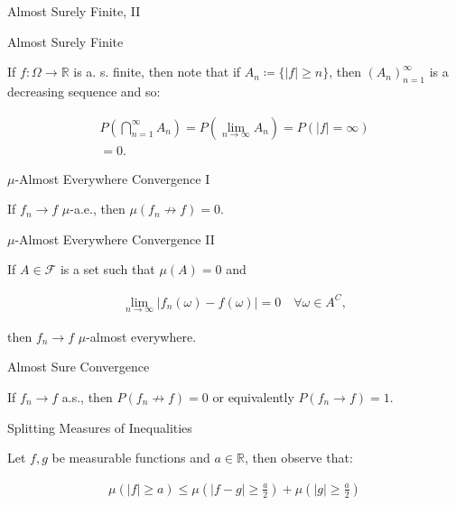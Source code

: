 \documentclass[10pt,landscape]{article}
\renewcommand{\leq}{\leqslant}
\renewcommand{\geq}{\geqslant}
\newcommand{\CalF}{\mathcal{F}}
\begin{document}
\begin{multicols}{3}
\begin{observation}{}{Almost Surely Finite, II}
\end{observation}

\begin{observation}{}{Almost Surely Finite}

    If $f: \Omega \to \mathbb{R}$ is a. s. finite, then note that if $A_n \coloneqq \{ |f| \geq n \}$, then $(A_n)_{n=1}^{\infty}$ is a decreasing sequence and so:

        \begin{align*}
            P\left(\bigcap_{n=1}^{\infty} A_n\right) = P\left(\lim_{n \to \infty} A_n\right) = P(|f| = \infty) \\ = 0.
        \end{align*}

\end{observation}

\begin{observation}{}{$\mu$-Almost Everywhere Convergence I}

    If $f_n \to f$ $\mu$-a.e., then $\mu(f_n \not\to f) = 0$.

\end{observation}

\begin{observation}{}{$\mu$-Almost Everywhere Convergence II}

    If $A \in \CalF$ is a set such that $\mu(A) = 0$ and

        \begin{align*}
            \lim_{n \to \infty} |f_n(\omega) - f(\omega)| = 0 \quad \forall \omega \in A^C,
        \end{align*}

    then $f_n \to f$ $\mu$-almost everywhere.

\end{observation}

\begin{observation}{}{Almost Sure Convergence}

    If $f_n \to f$ a.s., then $P(f_n \not\to f) = 0$ or equivalently $P(f_n \to f) = 1$.

\end{observation}

\begin{observation}{}{Splitting Measures of Inequalities}

    Let $f,g$ be measurable functions and $a \in \mathbb{R}$, then observe that:

        \begin{align*}
            \mu(|f| \geq a) \leq \mu\left( |f - g| \geq \frac{a}{2} \right) + \mu\left( |g| \geq \frac{a}{2} \right)
        \end{align*}


\end{observation}
\end{multicols}
\end{document}
